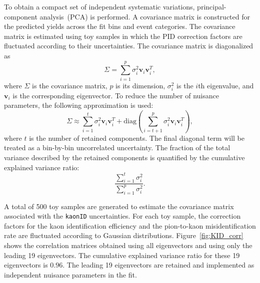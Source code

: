 To obtain a compact set of independent systematic variations, principal-component analysis~(PCA) is performed.
A covariance matrix is constructed for the predicted yields across the fit bins and event categories.
The covariance matrix is estimated using toy samples in which the PID correction factors are fluctuated according to their uncertainties.
The covariance matrix is diagonalized as
\begin{equation}
  \Sigma=\sum_{i=1}^{p}\sigma_{i}^{2} \textbf{v}_{i} \textbf{v}_{i}^{T},
\end{equation}
where $\Sigma$ is the covariance matrix, $p$ is its dimension, $\sigma_{i}^{2}$ is the $i$th eigenvalue, and $\textbf{v}_{i}$ is the corresponding eigenvector.
To reduce the number of nuisance parameters, the following approximation is used:
\begin{equation}
  \label{eq:PCA_approximation}
  \Sigma \approx \sum_{i=1}^{t}\sigma_{i}^{2} \textbf{v}_{i} \textbf{v}_{i}^{T} + \textrm{diag} \left( \sum_{i=t+1}^{p}\sigma_{i}^{2} \textbf{v}_{i} \textbf{v}_{i}^{T} \right),
\end{equation}
where $t$ is the number of retained components.
The final diagonal term will be treated as a bin-by-bin uncorrelated uncertainty.
The fraction of the total variance described by the retained components is quantified by the cumulative explained variance ratio:
\begin{equation}
    \frac{\sum_{i=1}^{t}\sigma_{i}^{2}}{\sum_{i=1}^{p}\sigma_{i}^{2}}.
\end{equation}

A total of 500 toy samples are generated to estimate the covariance matrix associated with the \texttt{kaonID} uncertainties.
For each toy sample, the correction factors for the kaon identification efficiency and the pion-to-kaon misidentification rate are fluctuated according to Gaussian distributions.
Figure~\ref{fig:KID_corr} shows the correlation matrices obtained using all eigenvectors and using only the leading 19 eigenvectors.
The cumulative explained variance ratio for these 19 eigenvectors is $0.96$.
The leading 19 eigenvectors are retained and implemented as independent nuisance parameters in the fit.

